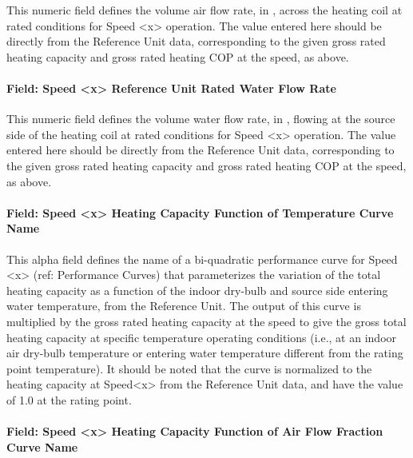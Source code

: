 This numeric field defines the volume air flow rate, in \si{\volumeFlowRate}, across the heating coil at rated conditions for Speed \textless{}x\textgreater{} operation. The value entered here should be directly from the Reference Unit data, corresponding to the given gross rated heating capacity and gross rated heating COP at the speed, as above.

\paragraph{Field: Speed \textless{}x\textgreater{} Reference Unit Rated Water Flow Rate}\label{field-speed-x-reference-unit-rated-water-flow-rate-1}

This numeric field defines the volume water flow rate, in \si{\volumeFlowRate}, flowing at the source side of the heating coil at rated conditions for Speed \textless{}x\textgreater{} operation. The value entered here should be directly from the Reference Unit data, corresponding to the given gross rated heating capacity and gross rated heating COP at the speed, as above.

\paragraph{Field: Speed \textless{}x\textgreater{} Heating Capacity Function of Temperature Curve Name}\label{field-speed-x-heating-capacity-function-of-temperature-curve-name-2}

This alpha field defines the name of a bi-quadratic performance curve for Speed \textless{}x\textgreater{} (ref: Performance Curves) that parameterizes the variation of the total heating capacity as a function of the indoor dry-bulb and source side entering water temperature, from the Reference Unit. The output of this curve is multiplied by the gross rated heating capacity at the speed to give the gross total heating capacity at specific temperature operating conditions (i.e., at an indoor air dry-bulb temperature or entering water temperature different from the rating point temperature). It should be noted that the curve is normalized to the heating capacity at Speed\textless{}x\textgreater{} from the Reference Unit data, and have the value of 1.0 at the rating point.

\paragraph{Field: Speed \textless{}x\textgreater{} Heating Capacity Function of Air Flow Fraction Curve Name}\label{field-speed-x-heating-capacity-function-of-air-flow-fraction-curve-name-1}

